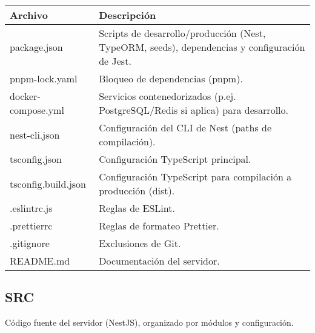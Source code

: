 \begin{table}[H]
  \doublespacing
  \begin{tabularx}{\textwidth}{l X}
    \hline
    \textbf{Archivo}    & \textbf{Descripción}                                                                           \\
    \hline
    package.json        & Scripts de desarrollo/producción (Nest, TypeORM, seeds), dependencias y configuración de Jest. \\
    pnpm-lock.yaml      & Bloqueo de dependencias (pnpm).                                                                \\
    docker-compose.yml  & Servicios contenedorizados (p.ej. PostgreSQL/Redis si aplica) para desarrollo.                 \\
    nest-cli.json       & Configuración del CLI de Nest (paths de compilación).                                          \\
    tsconfig.json       & Configuración TypeScript principal.                                                            \\
    tsconfig.build.json & Configuración TypeScript para compilación a producción (dist).                                 \\
    .eslintrc.js        & Reglas de ESLint.                                                                              \\
    .prettierrc         & Reglas de formateo Prettier.                                                                   \\
    .gitignore          &
    Exclusiones de Git.                                                                                                  \\
    README.md           &
    Documentación del servidor.                                                                                          \\
    \hline
  \end{tabularx}
\end{table}

\subsection*{SRC}

Código fuente del servidor (NestJS), organizado por módulos y configuración.

